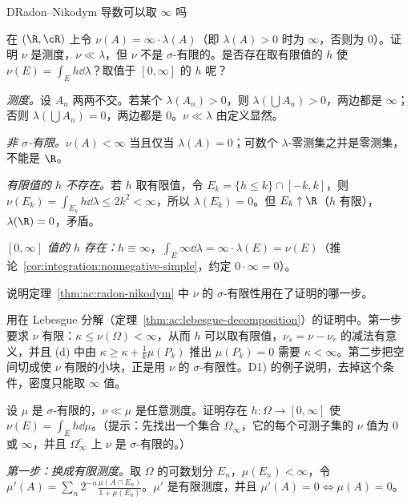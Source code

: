 \begin{probleme}[问题]{D}{Radon--Nikodym 导数可以取 \texorpdfstring{$\infty$}{∞} 吗}
\begin{questions}
\item 在 $(\R,\cR)$ 上令 $\nu(A)=\infty\cdot\lambda(A)$（即 $\lambda(A)>0$ 时为 $\infty$，否则为 $0$）。证明 $\nu$ 是测度，$\nu\ll\lambda$，但 $\nu$ 不是 $\sigma$-有限的。是否存在取有限值的 $h$ 使 $\nu(E)=\int_Eh\dd\lambda$？取值于 $[0,\infty]$ 的 $h$ 呢？
\begin{solution}
\emph{测度。}设 $A_n$ 两两不交。若某个 $\lambda(A_n)>0$，则 $\lambda(\bigcup A_n)>0$，两边都是 $\infty$；否则 $\lambda(\bigcup A_n)=0$，两边都是 $0$。$\nu\ll\lambda$ 由定义显然。

\emph{非 $\sigma$-有限。}$\nu(A)<\infty$ 当且仅当 $\lambda(A)=0$；可数个 $\lambda$-零测集之并是零测集，不能是 $\R$。

\emph{有限值的 $h$ 不存在。}若 $h$ 取有限值，令 $E_k=\{h\leqslant k\}\cap[-k,k]$，则 $\nu(E_k)=\int_{E_k}h\dd\lambda\leqslant2k^2<\infty$，所以 $\lambda(E_k)=0$。但 $E_k\uparrow\R$（$h$ 有限），$\lambda(\R)=0$，矛盾。

\emph{$[0,\infty]$ 值的 $h$ 存在：}$h\equiv\infty$，$\int_E\infty\dd\lambda=\infty\cdot\lambda(E)=\nu(E)$（推论~\ref{cor:integration:nonnegative-simple}，约定 $0\cdot\infty=0$）。
\end{solution}
\item 说明定理~\ref{thm:ac:radon-nikodym} 中 $\nu$ 的 $\sigma$-有限性用在了证明的哪一步。
\begin{solution}
用在 Lebesgue 分解（定理~\ref{thm:ac:lebesgue-decomposition}）的证明中。第一步要求 $\nu$ 有限：$\kappa\leqslant\nu(\Omega)<\infty$，从而 $h$ 可以取有限值，$\nu_s=\nu-\nu_r$ 的减法有意义，并且 (d) 中由 $\kappa\geqslant\kappa+\frac1k\mu(P_k)$ 推出 $\mu(P_k)=0$ 需要 $\kappa<\infty$。第二步把空间切成使 $\nu$ 有限的小块，正是用 $\nu$ 的 $\sigma$-有限性。D1) 的例子说明，去掉这个条件，密度只能取 $\infty$ 值。
\end{solution}
\item 设 $\mu$ 是 $\sigma$-有限的，$\nu\ll\mu$ 是任意测度。证明存在 $h:\Omega\to[0,\infty]$ 使 $\nu(E)=\int_Eh\dd\mu$。（提示：先找出一个集合 $\Omega_\infty$，它的每个可测子集的 $\nu$ 值为 $0$ 或 $\infty$，并且 $\Omega_\infty^c$ 上 $\nu$ 是 $\sigma$-有限的。）
\begin{solution}
\emph{第一步：换成有限测度。}取 $\Omega$ 的可数划分 $E_n$，$\mu(E_n)<\infty$，令 $\mu'(A)=\sum_n2^{-n}\frac{\mu(A\cap E_n)}{1+\mu(E_n)}$。$\mu'$ 是有限测度，并且 $\mu'(A)=0\iff\mu(A)=0$。


\end{solution}
\end{questions}
\end{probleme}
